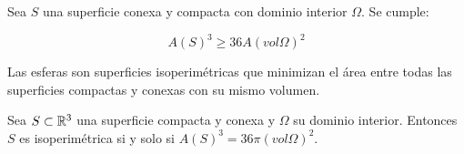 \begin{theorem}
Sea $S$ una superficie conexa y compacta con dominio interior $\Omega$. Se cumple:

\begin{equation*}
    A(S)^3 \geq 36A(vol\Omega)^2
\end{equation*}
\end{theorem}

\begin{proposition}
Las esferas son superficies isoperimétricas que minimizan el área entre todas las superficies compactas y conexas con su mismo volumen.
\end{proposition}

\begin{corolario}
Sea $S \subset \mathbb{R}^3$ una superficie compacta y conexa y $\Omega$ su dominio interior. Entonces $S$ es isoperimétrica si y solo si $A(S)^3 = 36\pi (vol \Omega)^2$.
\end{corolario}
